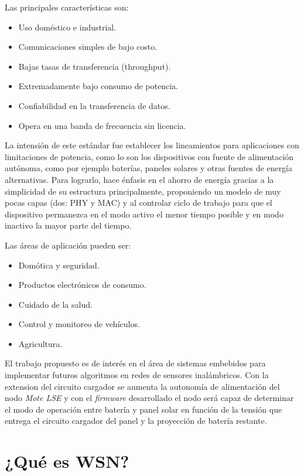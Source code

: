 \noindent Las principales características son:
		\begin{itemize}
			\item Uso doméstico e industrial.
			\item Comunicaciones simples de bajo costo. 
			\item Bajas tasas de transferencia (throughput).
			\item Extremadamente bajo consumo de potencia.
			\item Confiabilidad en la transferencia de datos.
			\item Opera en una banda de frecuencia sin licencia.
		\end{itemize}

La intensión de este estándar fue establecer los lineamientos para aplicaciones con limitaciones de potencia, como lo son los dispositivos con fuente de alimentación autónoma, como por ejemplo baterías, paneles solares y otras fuentes de energía alternativas. Para lograrlo, hace énfasis en el ahorro de energía gracias a la simplicidad de su estructura principalmente, proponiendo un modelo de muy pocas capas (dos: PHY y MAC) y al controlar ciclo de trabajo para que el dispositivo permanezca en el modo activo el menor tiempo posible y en modo inactivo la mayor parte del tiempo.

\noindent Las áreas de aplicación pueden ser:
		\begin{itemize}
			\item Domótica y seguridad.
			\item Productos electrónicos de consumo.
			\item Cuidado de la salud.
			\item Control y monitoreo de vehículos.
			\item Agricultura.
		\end{itemize}

El trabajo propuesto es de interés en el área de sistemas embebidos para implementar futuros algoritmos en redes de sensores inalámbricos. Con la extension del circuito cargador se aumenta la autonomía de alimentación del nodo \textit{Mote LSE} y con el \textit{firmware} desarrollado el nodo será capaz de determinar el modo de operación entre batería y panel solar en función de la tensión que entrega el circuito cargador del panel y la proyección de batería restante.

\section{¿Qué es WSN?}
\label{sec:wsn}

